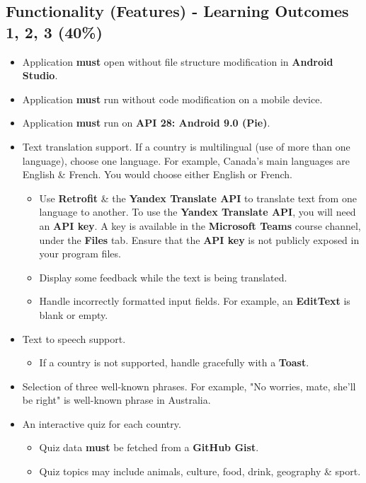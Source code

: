 \documentclass{article}
\begin{document}
\subsection*{Functionality (Features) - Learning Outcomes 1, 2, 3 (40\%)}
\begin{itemize}
	\item Application \textbf{must} open without file structure modification in \textbf{Android Studio}.
	\item Application \textbf{must} run without code modification on a mobile device.
	\item Application \textbf{must} run on \textbf{API 28: Android 9.0 (Pie)}.
	\item Text translation support. If a country is multilingual (use of more than one language), choose one language. For example, Canada's main languages are English \& French. You would choose either English or French.
	      \begin{itemize}
	      	\item Use \textbf{Retrofit} \& the \textbf{Yandex Translate API} to translate text from one language to another. To use the \textbf{Yandex Translate API}, you will need an \textbf{API key}. A key is available in the \textbf{Microsoft Teams} course channel, under the \textbf{Files} tab. Ensure that the \textbf{API key} is not publicly exposed in your program files.
	      	\item Display some feedback while the text is being translated.
	      	\item Handle incorrectly formatted input fields. For example, an \textbf{EditText} is blank or empty.
	      \end{itemize}
	\item Text to speech support.
	      \begin{itemize}
	      	\item If a country is not supported, handle gracefully with a \textbf{Toast}.
	      \end{itemize}
	\item Selection of three well-known phrases. For example, "No worries, mate, she'll be right" is well-known phrase in Australia.
	\item An interactive quiz for each country.
	      \begin{itemize}
	      	\item Quiz data \textbf{must} be fetched from a \textbf{GitHub Gist}.
	      	\item Quiz topics may include animals, culture, food, drink, geography \& sport.

\end{itemize}
\end{itemize}
\end{document}
